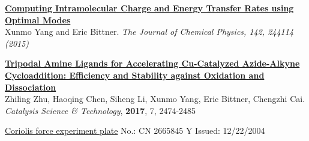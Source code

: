 \documentclass[12pt,letterpaper]{article}
\newcommand{\mhead}[1]{\leavevmode\marginpar{\sffamily\footnotesize #1}}
\begin{document}
\href{http://scitation.aip.org/content/aip/journal/jcp/142/24/10.1063/1.4923191}{\textbf{Computing Intramolecular Charge and Energy Transfer Rates using Optimal Modes}}\\
Xunmo Yang and Eric Bittner. \emph{The Journal of Chemical Physics, \emph{142}, 244114 (2015)}

\href{http://pubs.rsc.org/-/content/articlelanding/2017/cy/c7cy00587c/unauth#!divAbstract}{\textbf{Tripodal Amine Ligands for Accelerating Cu-Catalyzed Azide-Alkyne Cycloaddition: Efficiency and Stability against Oxidation and Dissociation}}\\
Zhiling Zhu, Haoqing Chen, Siheng Li, Xunmo Yang, Eric Bittner, Chengzhi Cai. \emph{Catalysis Science \& Technology}, \textbf{2017}, 7, 2474-2485  

\bigskip
\mhead{Patent}%
\href{https://www.google.com/patents/CN2665845Y?cl=en}{Coriolis force experiment plate} \quad\quad\quad\quad No.: CN 2665845 Y  \quad\quad\quad\quad Issued: 12/22/2004
\end{document}
